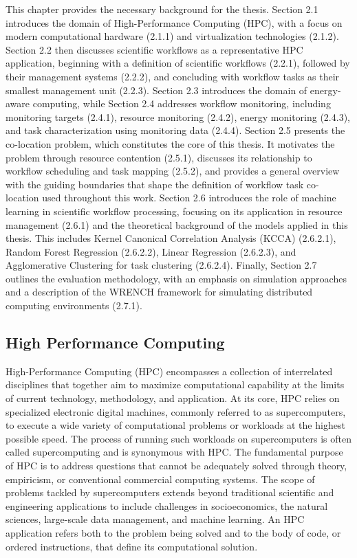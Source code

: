 This chapter provides the necessary background for the thesis. Section 2.1 introduces the domain of High-Performance Computing (HPC), with a focus on modern computational hardware (2.1.1) and virtualization technologies (2.1.2). Section 2.2 then discusses scientific workflows as a representative HPC application, beginning with a definition of scientific workflows (2.2.1), followed by their management systems (2.2.2), and concluding with workflow tasks as their smallest management unit (2.2.3). Section 2.3 introduces the domain of energy-aware computing, while Section 2.4 addresses workflow monitoring, including monitoring targets (2.4.1), resource monitoring (2.4.2), energy monitoring (2.4.3), and task characterization using monitoring data (2.4.4). Section 2.5 presents the co-location problem, which constitutes the core of this thesis. It motivates the problem through resource contention (2.5.1), discusses its relationship to workflow scheduling and task mapping (2.5.2), and provides a general overview with the guiding boundaries that shape the definition of workflow task co-location used throughout this work. Section 2.6 introduces the role of machine learning in scientific workflow processing, focusing on its application in resource management (2.6.1) and the theoretical background of the models applied in this thesis. This includes Kernel Canonical Correlation Analysis (KCCA) (2.6.2.1), Random Forest Regression (2.6.2.2), Linear Regression (2.6.2.3), and Agglomerative Clustering for task clustering (2.6.2.4). Finally, Section 2.7 outlines the evaluation methodology, with an emphasis on simulation approaches and a description of the WRENCH framework for simulating distributed computing environments (2.7.1).

\subsection{High Performance Computing}
\label{sec:background_hpc}
High-Performance Computing (HPC) encompasses a collection of interrelated disciplines that together aim to maximize computational capability at the limits of current technology, methodology, and application. At its core, HPC relies on specialized electronic digital machines, commonly referred to as supercomputers, to execute a wide variety of computational problems or workloads at the highest possible speed. The process of running such workloads on supercomputers is often called supercomputing and is synonymous with HPC. The fundamental purpose of HPC is to address questions that cannot be adequately solved through theory, empiricism, or conventional commercial computing systems. The scope of problems tackled by supercomputers extends beyond traditional scientific and engineering applications to include challenges in socioeconomics, the natural sciences, large-scale data management, and machine learning. An HPC application refers both to the problem being solved and to the body of code, or ordered instructions, that define its computational solution.

